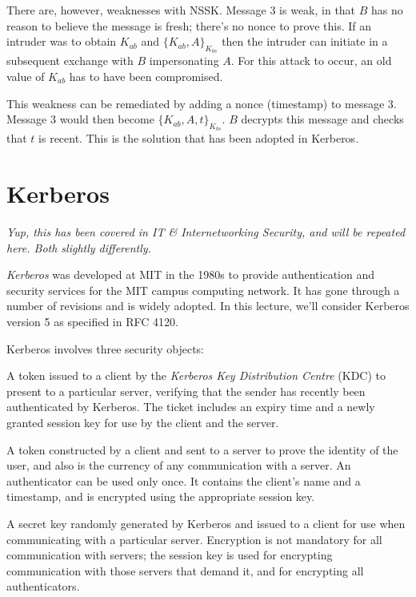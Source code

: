 There are, however, weaknesses with NSSK. Message 3 is weak, in that $B$ has no reason to believe the message is fresh; there's no nonce to prove this. If an intruder was to obtain $K_{ab}$ and $\{K_{ab}, A\}_{K_{bs}}$ then the intruder can initiate in a subsequent exchange with $B$ impersonating $A$. For this attack to occur, an old value of $K_{ab}$ has to have been compromised. 

This weakness can be remediated by adding a nonce (timestamp) to message 3. Message 3 would then become $\{K_{ab}, A, t\}_{K_{bs}}$. $B$ decrypts this message and checks that $t$ is recent. This is the solution that has been adopted in Kerberos.

\section{Kerberos}
\textit{Yup, this has been covered in IT \& Internetworking Security, and will be repeated here. Both slightly differently.}

\textit{Kerberos} was developed at MIT in the 1980s to provide authentication and security services for the MIT campus computing network. It has gone through a number of revisions and is widely adopted. In this lecture, we'll consider Kerberos version 5 as specified in RFC 4120. 

Kerberos involves three security objects:
\begin{define}
    \item[Ticket] A token issued to a client by the \textit{Kerberos Key Distribution Centre} (KDC) to present to a particular server, verifying that the sender has recently been authenticated by Kerberos. The ticket includes an expiry time and a newly granted session key for use by the client and the server.
    \item[Authenticator] A token constructed by a client and sent to a server to prove the identity of the user, and also is the currency of any communication with a server. An authenticator can be used only once. It contains the client's name and a timestamp, and is encrypted using the appropriate session key.
    \item[Session Key] A secret key randomly generated by Kerberos and issued to a client for use when communicating with a particular server. Encryption is not mandatory for all communication with servers; the session key is used for encrypting communication with those servers that demand it, and for encrypting all authenticators. 
\end{define}

